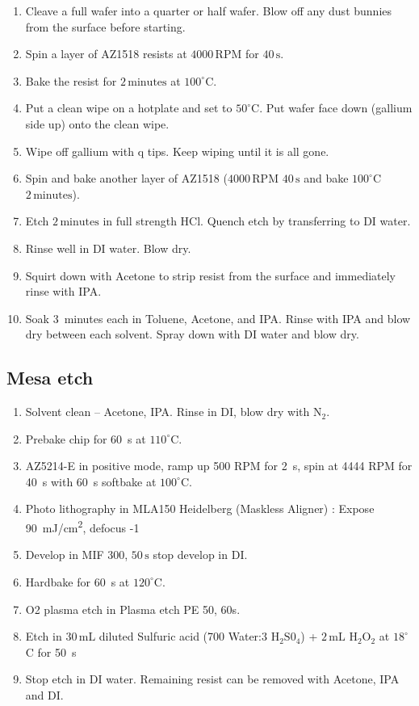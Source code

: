 \begin{enumerate}
\item Cleave a full wafer into a quarter or half wafer. Blow off any dust bunnies from the surface before starting.
\item Spin a layer of AZ1518 resists at $4000 \,\mathrm{RPM}$ for $40\,\mathrm{s}$.
\item Bake the resist for $2\,\mathrm{minutes}$ at $100^\circ$C.
\item Put a clean wipe on a hotplate and set to $50^\circ$C. Put wafer face down (gallium side up) onto the clean wipe.
\item Wipe off gallium with q tips. Keep wiping until it is all gone.
\item Spin and bake another layer of AZ1518 ($4000 \,\mathrm{RPM}$ $40\,\mathrm{s}$ and bake $100^\circ$C $2\,\mathrm{minutes}$).
\item Etch $2 \,\mathrm{minutes}$ in full strength HCl. Quench etch by transferring to DI water.
\item Rinse well in DI water. Blow dry.
\item Squirt down with Acetone to strip resist from the surface and immediately rinse with IPA.
\item Soak 3~minutes each in Toluene, Acetone, and IPA. Rinse with IPA and blow dry between each solvent. Spray down with DI water and blow dry.
\end{enumerate}

\subsection{Mesa etch}
\begin{enumerate}
\item Solvent clean – Acetone, IPA. Rinse in DI, blow dry with $\mathrm{N_2}$.
\item Prebake chip for \qty{60}{s} at $110^\circ$C.
\item AZ5214-E in positive mode, ramp up 500 RPM for \qty{2}{s}, spin at 4444 RPM for \qty{40}{s} with \qty{60}{s} softbake at $100^\circ$C.
\item Photo lithography in MLA150 Heidelberg (Maskless Aligner) : Expose \qty{90}{mJ/cm^2}, defocus -1 
\item Develop in MIF 300, $50\,\mathrm{s}$ stop develop in DI.
\item Hardbake for \qty{60}{s} at $120^\circ$C.
\item O2 plasma etch in Plasma etch PE 50, 60s.
\item Etch in $30\,\mathrm{mL}$ diluted Sulfuric acid (700 Water:3 $\mathrm{H_2S0_4}$) + $2 \,\mathrm{mL}$ $\mathrm{H_2O_2}$ at $18^\circ$C for \qty{50}{s}
\item Stop etch in DI water. Remaining resist can be removed with Acetone, IPA and DI.
\end{enumerate}




